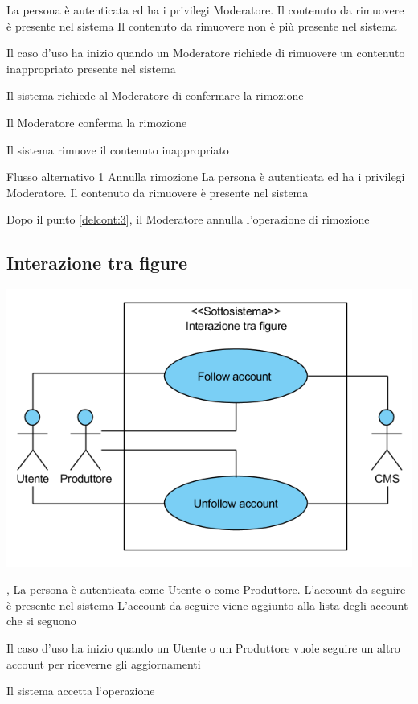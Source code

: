 \tabcuvspace

{}
{La persona è autenticata ed ha i privilegi Moderatore. Il contenuto da rimuovere è presente nel sistema}
{Il contenuto da rimuovere non è più presente nel sistema}
{\begin{enumCU}
	\item Il caso d'uso ha inizio quando un Moderatore richiede di rimuovere un contenuto inappropriato presente nel sistema
	\item Il sistema richiede al Moderatore di confermare la rimozione
	\item Il Moderatore conferma la rimozione \label{delcont:3}
	\item Il sistema rimuove il contenuto inappropriato
\end{enumCU}}
%
{Flusso alternativo 1}%
{Annulla rimozione}%
{La persona è autenticata ed ha i privilegi Moderatore. Il contenuto da rimuovere è presente nel sistema}
{\postNulle}%
{\begin{enumCU}
		\item Dopo il punto \ref{delcont:3}, il Moderatore annulla l'operazione di rimozione
\end{enumCU}}%


\subsection{Interazione tra figure}
\begin{center}
   \includegraphics[width=\textwidth]{assets/visualParadigm/InterazioneTraFigure}
\end{center}
{, }
{La persona è autenticata come Utente o come Produttore. L'account da seguire è presente nel sistema}
{L'account da seguire viene aggiunto alla lista degli account che si seguono}
{\begin{enumCU}
	\item Il caso d'uso ha inizio quando un Utente o un Produttore vuole seguire un altro account per riceverne gli aggiornamenti
	\item Il sistema accetta l`operazione
\end{enumCU}}

